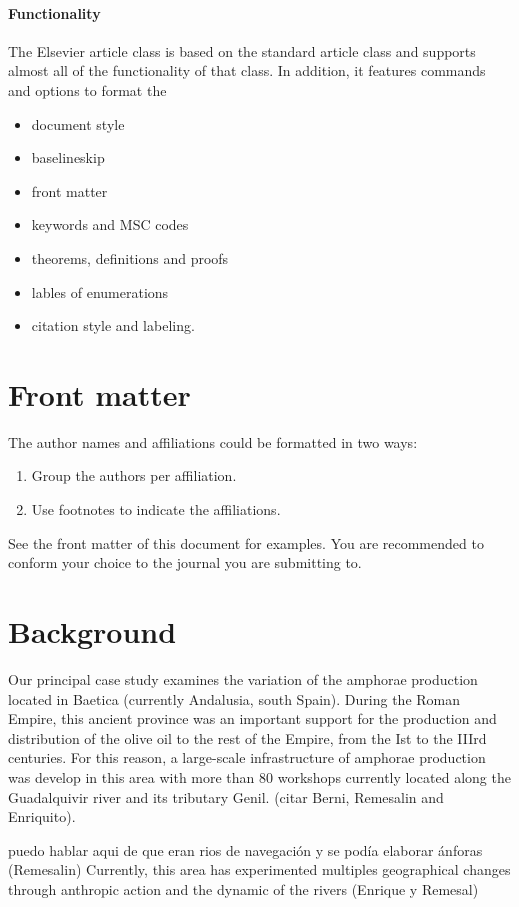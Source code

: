 \documentclass[review]{elsarticle}
\begin{document}
\paragraph{Functionality} The Elsevier article class is based on the standard article class and supports almost all of the functionality of that class. In addition, it features commands and options to format the
\begin{itemize}
\item document style
\item baselineskip
\item front matter
\item keywords and MSC codes
\item theorems, definitions and proofs
\item lables of enumerations
\item citation style and labeling.
\end{itemize}

\section{Front matter}

The author names and affiliations could be formatted in two ways:
\begin{enumerate}[(1)]
\item Group the authors per affiliation.
\item Use footnotes to indicate the affiliations.
\end{enumerate}
See the front matter of this document for examples. You are recommended to conform your choice to the journal you are submitting to.


\section{Background}

Our principal case study examines the variation of the amphorae production located in Baetica (currently Andalusia, south Spain). During the Roman Empire, this ancient province was an important support for the production and distribution of the olive oil to the rest of the Empire, from the Ist to the IIIrd centuries. 
For this reason, a large-scale infrastructure of amphorae production was develop in this area with more than 80 workshops currently located along the Guadalquivir river and its tributary Genil. (citar Berni, Remesalin and Enriquito). 

puedo hablar aqui de que eran rios de navegación y se podía elaborar ánforas (Remesalin)
Currently, this area has experimented multiples geographical changes through anthropic action and the dynamic of the rivers (Enrique y Remesal)
\end{document}

